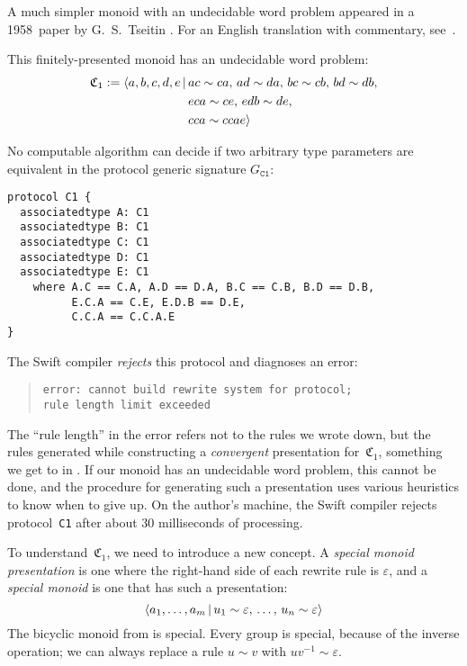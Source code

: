 \documentclass[../generics]{subfiles}
\begin{document}
A much simpler monoid with an undecidable word problem appeared in a 1958~paper by G.~S.~Tseitin \cite{undecidablesemigroup}. For an English translation with commentary, see~\cite{nybergbrodda2024g}.

\newcommand{\Ts}{\mathfrak{C}_1}

\begin{theorem}\label{undecidablemonoid}
This finitely-presented monoid has an undecidable word problem:
\begin{align*}
\Ts := \Pres{a,b,c,d,e}{&ac\sim ca,\,ad\sim da,\,bc\sim cb,\,bd\sim db,\\
&eca\sim ce,\,edb\sim de,\\
&cca\sim ccae}
\end{align*}
\end{theorem}
\begin{corollary}
No computable algorithm can decide if two arbitrary type parameters are equivalent in the protocol generic signature $G_\texttt{C1}$:
\begin{Verbatim}
protocol C1 {
  associatedtype A: C1
  associatedtype B: C1
  associatedtype C: C1
  associatedtype D: C1
  associatedtype E: C1
    where A.C == C.A, A.D == D.A, B.C == C.B, B.D == D.B,
          E.C.A == C.E, E.D.B == D.E,
          C.C.A == C.C.A.E
}
\end{Verbatim}
The Swift compiler \emph{rejects} this protocol and diagnoses an error:
\begin{quote}
\begin{verbatim}
error: cannot build rewrite system for protocol;
rule length limit exceeded
\end{verbatim}
\end{quote}
The ``rule length'' in the error refers not to the rules we wrote down, but the rules generated while constructing a \emph{convergent} presentation for~$\Ts$, something we get to in . If our monoid has an undecidable word problem, this cannot be done, and the procedure for generating such a presentation uses various heuristics to know when to give up. On the author's machine, the Swift compiler rejects protocol~\texttt{C1} after about 30 milliseconds of processing.
\end{corollary}

To understand~$\Ts$, we need to introduce a new concept. A \emph{special monoid presentation} is one where the right-hand side of each rewrite rule is $\varepsilon$, and a \emph{special monoid} is one that has such a presentation:
\[\langle a_1, \ldots, a_m\,|\,u_1 \sim \varepsilon,\, \ldots,\, u_n \sim \varepsilon\rangle\]
The bicyclic monoid from  is special. Every group is special, because of the inverse operation; we can always replace a rule $u\sim v$ with $uv^{-1}\sim\varepsilon$.
\end{document}
